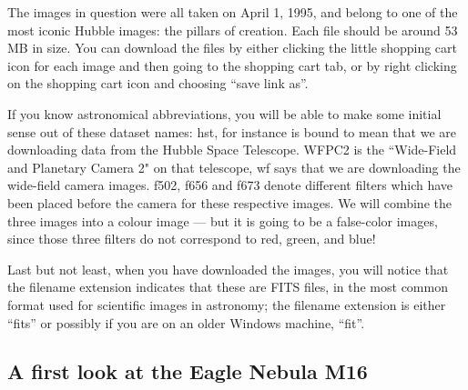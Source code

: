 \documentclass[twocolumn,apj]{openjournal}
\begin{document}
The images in question were all taken on April 1, 1995, and belong to one of the most iconic Hubble images: the pillars of creation. Each file should be around 53 MB in size. You can download the files by either clicking the little shopping cart icon for each image and then going to the shopping cart tab, or by right clicking on the shopping cart icon and choosing ``save link as''.

If you know astronomical abbreviations, you will be able to make some initial sense out of these dataset names: hst, for instance is bound to mean that we are downloading data from the Hubble Space Telescope. WFPC2 is the ``Wide-Field and Planetary Camera 2" on that telescope, wf says that we are downloading the wide-field camera images. f502, f656 and f673 denote different filters which have been placed before the camera for these respective images. We will combine the three images into a colour image --- but it is going to be a false-color images, since those three filters do not correspond to red, green, and blue!

Last but not least, when you have downloaded the images, you will notice that the filename extension indicates that these are FITS files, in the most common format used for scientific images in astronomy; the filename extension is either ``fits'' or possibly if you are on an older Windows machine, ``fit''. 

\subsection{A first look at the Eagle Nebula M16}
\end{document}
